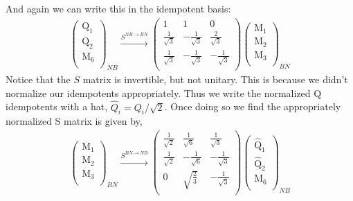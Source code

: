 \documentclass[12pt,a4paper]{article}
\newcounter{arrow}
\begin{document}
And again we can write this in the idempotent basis:
\begin{align}
\left( \begin{matrix}
\text{Q}_1\\
\text{Q}_2\\
\text{M}_6\\
\end{matrix} \right)_{NB}
\xrightarrow{S^{NB \rightarrow BN}}
\left( \begin{matrix}
1& 1& 0 \\
\frac{1}{\sqrt{3}} & - \frac{1}{\sqrt{3}} & \frac{2}{\sqrt{3}} \\
\frac{1}{\sqrt{3}} & - \frac{1}{\sqrt{3}} & - \frac{1}{\sqrt{3}} \\
\end{matrix} \right)
\left( \begin{matrix}
\text{M}_1\\
\text{M}_2\\
\text{M}_3\\
\end{matrix} \right)_{BN}
\end{align}
Notice that the $S$ matrix is invertible, but not unitary. 
This is because we didn't normalize our idempotents appropriately. 
Thus we write the normalized Q idempotents with a hat, $\widehat{Q}_i = Q_i /\sqrt{2}$.
Once doing so we find the appropriately normalized S matrix is given by,
\begin{align}\left( \begin{matrix}
\text{M}_1\\
\text{M}_2\\
\text{M}_3\\
\end{matrix} \right)_{BN}
\xrightarrow{S^{BN \rightarrow NB}}
\left( \begin{matrix}
\frac{1}{\sqrt{2}} & \frac{1}{\sqrt{6}} &  \frac{1}{\sqrt{3}} \\
\frac{1}{\sqrt{2}} & - \frac{1}{\sqrt{6}} & -\frac{1}{\sqrt{3}} \\
0& \sqrt{\frac{2}{3}} & -\frac{1}{\sqrt{3}} \\
\end{matrix} \right)
\left( \begin{matrix}
\widehat{\text{Q}}_1\\
\widehat{\text{Q}}_2\\
\text{M}_6\\
\end{matrix} \right)_{NB}
\end{align}
\end{document}
